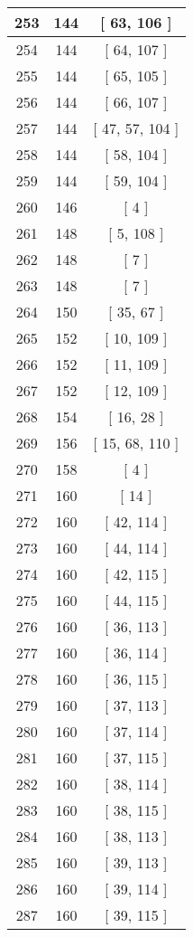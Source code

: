 \begin{center}
\begin{longtable}[H]{|| c c c ||}
\hline
253 & 144 & [ 63, 106 ] \\ 
\hline
254 & 144 & [ 64, 107 ] \\ 
\hline
255 & 144 & [ 65, 105 ] \\ 
\hline
256 & 144 & [ 66, 107 ] \\ 
\hline
257 & 144 & [ 47, 57, 104 ] \\ 
\hline
258 & 144 & [ 58, 104 ] \\ 
\hline
259 & 144 & [ 59, 104 ] \\ 
\hline
260 & 146 & [ 4 ] \\ 
\hline
261 & 148 & [ 5, 108 ] \\ 
\hline
262 & 148 & [ 7 ] \\ 
\hline
263 & 148 & [ 7 ] \\ 
\hline
264 & 150 & [ 35, 67 ] \\ 
\hline
265 & 152 & [ 10, 109 ] \\ 
\hline
266 & 152 & [ 11, 109 ] \\ 
\hline
267 & 152 & [ 12, 109 ] \\ 
\hline
268 & 154 & [ 16, 28 ] \\ 
\hline
269 & 156 & [ 15, 68, 110 ] \\ 
\hline
270 & 158 & [ 4 ] \\ 
\hline
271 & 160 & [ 14 ] \\ 
\hline
272 & 160 & [ 42, 114 ] \\ 
\hline
273 & 160 & [ 44, 114 ] \\ 
\hline
274 & 160 & [ 42, 115 ] \\ 
\hline
275 & 160 & [ 44, 115 ] \\ 
\hline
276 & 160 & [ 36, 113 ] \\ 
\hline
277 & 160 & [ 36, 114 ] \\ 
\hline
278 & 160 & [ 36, 115 ] \\ 
\hline
279 & 160 & [ 37, 113 ] \\ 
\hline
280 & 160 & [ 37, 114 ] \\ 
\hline
281 & 160 & [ 37, 115 ] \\ 
\hline
282 & 160 & [ 38, 114 ] \\ 
\hline
283 & 160 & [ 38, 115 ] \\ 
\hline
284 & 160 & [ 38, 113 ] \\ 
\hline
285 & 160 & [ 39, 113 ] \\ 
\hline
286 & 160 & [ 39, 114 ] \\ 
\hline
287 & 160 & [ 39, 115 ] \\ 

\end{longtable}
\end{center}

